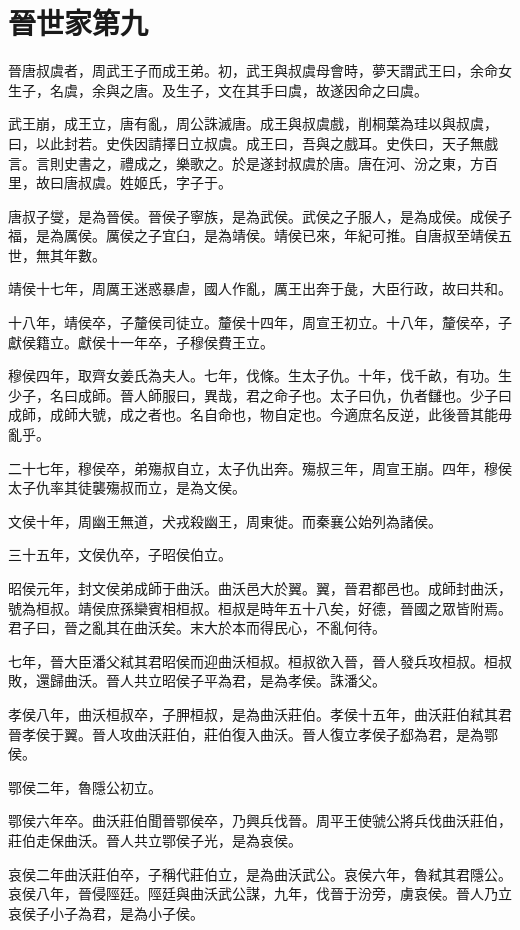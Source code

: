 \chapter{晉世家第九}

晉唐叔虞者，周武王子而成王弟。初，武王與叔虞母會時，夢天謂武王曰，余命女生子，名虞，余與之唐。及生子，文在其手曰虞，故遂因命之曰虞。

武王崩，成王立，唐有亂，周公誅滅唐。成王與叔虞戲，削桐葉為珪以與叔虞，曰，以此封若。史佚因請擇日立叔虞。成王曰，吾與之戲耳。史佚曰，天子無戲言。言則史書之，禮成之，樂歌之。於是遂封叔虞於唐。唐在河、汾之東，方百里，故曰唐叔虞。姓姬氏，字子于。

唐叔子燮，是為晉侯。晉侯子寧族，是為武侯。武侯之子服人，是為成侯。成侯子福，是為厲侯。厲侯之子宜臼，是為靖侯。靖侯已來，年紀可推。自唐叔至靖侯五世，無其年數。

靖侯十七年，周厲王迷惑暴虐，國人作亂，厲王出奔于彘，大臣行政，故曰共和。

十八年，靖侯卒，子釐侯司徒立。釐侯十四年，周宣王初立。十八年，釐侯卒，子獻侯籍立。獻侯十一年卒，子穆侯費王立。

穆侯四年，取齊女姜氏為夫人。七年，伐條。生太子仇。十年，伐千畝，有功。生少子，名曰成師。晉人師服曰，異哉，君之命子也。太子曰仇，仇者讎也。少子曰成師，成師大號，成之者也。名自命也，物自定也。今適庶名反逆，此後晉其能毋亂乎。

二十七年，穆侯卒，弟殤叔自立，太子仇出奔。殤叔三年，周宣王崩。四年，穆侯太子仇率其徒襲殤叔而立，是為文侯。

文侯十年，周幽王無道，犬戎殺幽王，周東徙。而秦襄公始列為諸侯。

三十五年，文侯仇卒，子昭侯伯立。

昭侯元年，封文侯弟成師于曲沃。曲沃邑大於翼。翼，晉君都邑也。成師封曲沃，號為桓叔。靖侯庶孫欒賓相桓叔。桓叔是時年五十八矣，好德，晉國之眾皆附焉。君子曰，晉之亂其在曲沃矣。末大於本而得民心，不亂何待。

七年，晉大臣潘父弒其君昭侯而迎曲沃桓叔。桓叔欲入晉，晉人發兵攻桓叔。桓叔敗，還歸曲沃。晉人共立昭侯子平為君，是為孝侯。誅潘父。

孝侯八年，曲沃桓叔卒，子胛桓叔，是為曲沃莊伯。孝侯十五年，曲沃莊伯弒其君晉孝侯于翼。晉人攻曲沃莊伯，莊伯復入曲沃。晉人復立孝侯子郄為君，是為鄂侯。

鄂侯二年，魯隱公初立。

鄂侯六年卒。曲沃莊伯聞晉鄂侯卒，乃興兵伐晉。周平王使虢公將兵伐曲沃莊伯，莊伯走保曲沃。晉人共立鄂侯子光，是為哀侯。

哀侯二年曲沃莊伯卒，子稱代莊伯立，是為曲沃武公。哀侯六年，魯弒其君隱公。哀侯八年，晉侵陘廷。陘廷與曲沃武公謀，九年，伐晉于汾旁，虜哀侯。晉人乃立哀侯子小子為君，是為小子侯。

